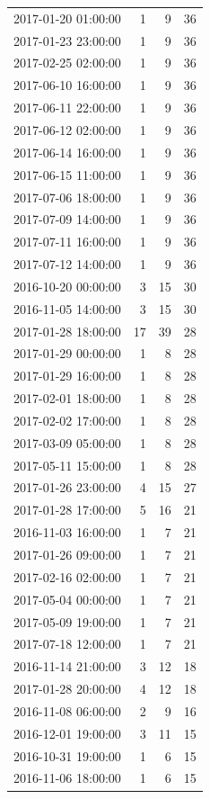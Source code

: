 \begin{tabular}{lrrr}
2017-01-20 01:00:00 & 1 & 9 & 36 \\
2017-01-23 23:00:00 & 1 & 9 & 36 \\
2017-02-25 02:00:00 & 1 & 9 & 36 \\
2017-06-10 16:00:00 & 1 & 9 & 36 \\
2017-06-11 22:00:00 & 1 & 9 & 36 \\
2017-06-12 02:00:00 & 1 & 9 & 36 \\
2017-06-14 16:00:00 & 1 & 9 & 36 \\
2017-06-15 11:00:00 & 1 & 9 & 36 \\
2017-07-06 18:00:00 & 1 & 9 & 36 \\
2017-07-09 14:00:00 & 1 & 9 & 36 \\
2017-07-11 16:00:00 & 1 & 9 & 36 \\
2017-07-12 14:00:00 & 1 & 9 & 36 \\
2016-10-20 00:00:00 & 3 & 15 & 30 \\
2016-11-05 14:00:00 & 3 & 15 & 30 \\
2017-01-28 18:00:00 & 17 & 39 & 28 \\
2017-01-29 00:00:00 & 1 & 8 & 28 \\
2017-01-29 16:00:00 & 1 & 8 & 28 \\
2017-02-01 18:00:00 & 1 & 8 & 28 \\
2017-02-02 17:00:00 & 1 & 8 & 28 \\
2017-03-09 05:00:00 & 1 & 8 & 28 \\
2017-05-11 15:00:00 & 1 & 8 & 28 \\
2017-01-26 23:00:00 & 4 & 15 & 27 \\
2017-01-28 17:00:00 & 5 & 16 & 21 \\
2016-11-03 16:00:00 & 1 & 7 & 21 \\
2017-01-26 09:00:00 & 1 & 7 & 21 \\
2017-02-16 02:00:00 & 1 & 7 & 21 \\
2017-05-04 00:00:00 & 1 & 7 & 21 \\
2017-05-09 19:00:00 & 1 & 7 & 21 \\
2017-07-18 12:00:00 & 1 & 7 & 21 \\
2016-11-14 21:00:00 & 3 & 12 & 18 \\
2017-01-28 20:00:00 & 4 & 12 & 18 \\
2016-11-08 06:00:00 & 2 & 9 & 16 \\
2016-12-01 19:00:00 & 3 & 11 & 15 \\
2016-10-31 19:00:00 & 1 & 6 & 15 \\
2016-11-06 18:00:00 & 1 & 6 & 15 \\

\end{tabular}
